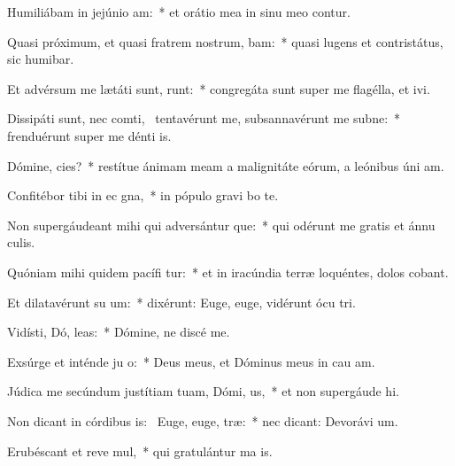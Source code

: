 \item Humiliábam in jejúnio  am:~* et orátio mea in sinu meo contur.
\item Quasi próximum, et quasi fratrem nostrum,  bam:~* quasi lugens et contristátus, sic humibar.
\item Et advérsum me lætáti sunt,  runt:~* congregáta sunt super me flagélla, et ivi.
\item Dissipáti sunt, nec comti,~\pscross{} tentavérunt me, subsannavérunt me subne:~* frenduérunt super me dénti is.
\item Dómine,  cies?~* restítue ánimam meam a malignitáte eórum, a leónibus úni am.
\item Confitébor tibi in ec gna,~* in pópulo gravi bo te.
\item Non supergáudeant mihi qui adversántur  que:~* qui odérunt me gratis et ánnu culis.
\item Quóniam mihi quidem pacífi tur:~* et in iracúndia terræ loquéntes, dolos cobant.
\item Et dilatavérunt su   um:~* dixérunt: Euge, euge, vidérunt ócu tri.
\item Vidísti, Dó,  leas:~* Dómine, ne discé  me.
\item Exsúrge et inténde ju o:~* Deus meus, et Dóminus meus in cau am.
\item Júdica me secúndum justítiam tuam, Dómi,  us,~* et non supergáude hi.
\item Non dicant in córdibus is:~\pscross{} Euge, euge,  træ:~* nec dicant: Devorávi um.
\item Erubéscant et reve mul,~* qui gratulántur ma is.
